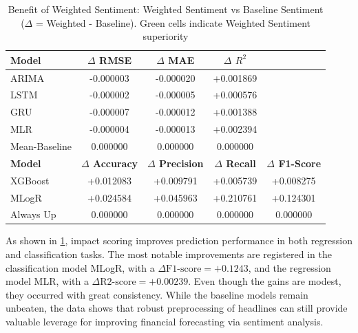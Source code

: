 \documentclass[Master,english,IEEE]{twbook}
\begin{document}
\begin{table}[H]
    \centering
    \small %
    \setlength{\tabcolsep}{4pt} %
    \begin{tabular}{|lcccc|}
        \hline
        \textbf{Model} & \textbf{$\Delta$ RMSE} & \textbf{$\Delta$ MAE} & \textbf{$\Delta$ $R^2$} & \\
        \hline
        ARIMA          & \cellcolor{green!25}-0.000003 & \cellcolor{green!25}-0.000020 & \cellcolor{green!25}+0.001869 & \\
        LSTM           & \cellcolor{green!25}-0.000002 & \cellcolor{green!25}-0.000005 & \cellcolor{green!25}+0.000576 & \\
        GRU            & \cellcolor{green!25}-0.000007 & \cellcolor{green!25}-0.000012 & \cellcolor{green!25}+0.001388 & \\
        MLR            & \cellcolor{green!25}-0.000004 & \cellcolor{green!25}-0.000013 & \cellcolor{green!25}+0.002394 & \\
        Mean-Baseline  &  0.000000                     &  0.000000                     &  0.000000                     & \\
        \hline
        \textbf{Model} & \textbf{$\Delta$ Accuracy} & \textbf{$\Delta$ Precision} & \textbf{$\Delta$ Recall} & \textbf{$\Delta$ F1-Score} \\
        \hline
        XGBoost        & \cellcolor{green!25}+0.012083 & \cellcolor{green!25}+0.009791 & \cellcolor{green!25}+0.005739 & \cellcolor{green!25}+0.008275 \\
        MLogR          & \cellcolor{green!25}+0.024584 & \cellcolor{green!25}+0.045963 & \cellcolor{green!25}+0.210761 & \cellcolor{green!25}+0.124301 \\
        Always Up      &  0.000000                     &  0.000000                     &  0.000000                     &  0.000000                     \\
        \hline
    \end{tabular}
    \caption{Benefit of Weighted Sentiment: Weighted Sentiment vs Baseline Sentiment ($\Delta$ = Weighted - Baseline). Green cells indicate Weighted Sentiment superiority}
    \label{tab:weighted_sentiment_advantage}
\end{table}

As shown in \ref{tab:weighted_sentiment_advantage}, impact scoring improves prediction performance in both regression and classification tasks. The most notable improvements are registered in the classification model MLogR, with a $\Delta \text{F1-score} = +0.1243$, and the regression model MLR, with a $\Delta \text{R2-score} = + 0.00239$. Even though the gains are modest, they occurred with great consistency. While the baseline models remain unbeaten, the data shows that robust preprocessing of headlines can still provide valuable leverage for improving financial forecasting via sentiment analysis.
\end{document}
